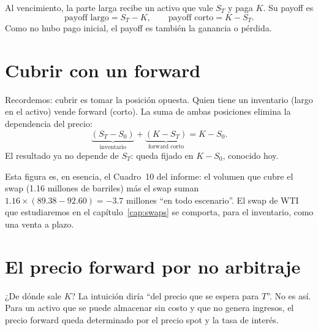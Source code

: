Al vencimiento, la parte larga recibe un activo que vale $S_T$ y paga $K$. Su payoff es
\[ \text{payoff largo}=S_T-K,\qquad \text{payoff corto}=K-S_T. \]
Como no hubo pago inicial, el payoff es también la ganancia o pérdida.


\section{Cubrir con un forward}

Recordemos: cubrir es tomar la posición opuesta. Quien tiene un inventario (largo en el activo) vende forward (corto). La suma de ambas posiciones elimina la dependencia del precio:
\[ \underbrace{(S_T-S_0)}_{\text{inventario}}+\underbrace{(K-S_T)}_{\text{forward corto}}=K-S_0. \]
El resultado ya no depende de $S_T$: queda fijado en $K-S_0$, conocido hoy.


\begin{informe}
Esta figura es, en esencia, el Cuadro~10 del informe: el volumen que cubre el swap (1.16 millones de barriles) más el swap suman $1.16\times(89.38-92.60)=-3.7$ millones \enquote{en todo escenario}. El swap de WTI que estudiaremos en el capítulo~\ref{cap:swaps} se comporta, para el inventario, como una venta a plazo.
\end{informe}

\section{El precio forward por no arbitraje}

¿De dónde sale $K$? La intuición diría \enquote{del precio que se espera para $T$}. No es así. Para un activo que se puede almacenar sin costo y que no genera ingresos, el precio forward queda determinado por el precio spot y la tasa de interés.

